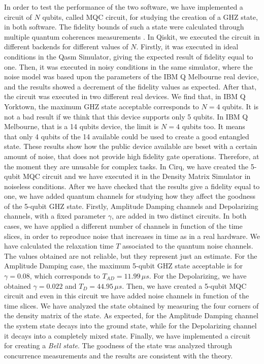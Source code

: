 \documentclass[11pt, a4paper, twoside, openright]{book}
\renewcommand{\'}[0]{\`}
\theoremstyle{definition}
\begin{document}
In order to test  the performance of the two software, we have implemented a circuit of $N$ qubits, called MQC circuit, for studying the creation of a GHZ state, in both software.
 The fidelity bounds of such a state were calculated through multiple quantum coherences measurements \cite{Article}.
  In Qiskit, we executed the circuit in different backends for different values of $N$. Firstly, it was executed in ideal conditions in the Qasm Simulator, giving the expected result of fidelity equal to one. Then, it was executed in noisy conditions in the same simulator, where the noise model was based upon the parameters of the IBM Q Melbourne real device, and the results showed a decrement of the fidelity values as expected. 
After that, the circuit was executed in two different real devices. We find that, in IBM Q Yorktown, the maximum GHZ state acceptable \cite{Fidelity} corresponds to $N=4$ qubits. It is not a bad result if we think that this device supports only 5 qubits. In IBM Q Melbourne, that is a 14 qubits device, the limit is $N=4$ qubits too. It means that only 4 qubits of the 14 available could be used to create a good entangled state.
These results show  how the public device available are beset with a certain amount of noise, that does not provide high fidelity gate operations. Therefore, at the moment they are unusable for complex tasks.
In Cirq, we have created the 5-qubit MQC circuit and we have executed it in the Density Matrix Simulator in noiseless conditions. After we have checked that the results give a fidelity equal to one, we have added quantum channels for studying how they affect the goodness of the 5-qubit GHZ state. 
Firstly, Amplitude Damping channels and Depolarizing channels, with a fixed parameter $\gamma$, are added in two distinct circuits. In both cases, we have applied a different number of channels in function of the time slices, in order to reproduce noise that increases in time as in a real hardware. We have calculated the relaxation time $T$ associated to the quantum noise channels. The values obtained are not reliable, but they represent just an estimate.
For the Amplitude Damping case, the maximum 5-qubit GHZ state acceptable is for $\gamma=0.08$, which corresponds to $T_{AD}=11.99\, \mu s$. For the Depolarizing, we have obtained $\gamma=0.022$ and $T_{D}=44.95\, \mu s$. Then, we have created a 5-qubit MQC circuit and even in this circuit we have added noise channels in function of the time slices. We have analyzed the state obtained by measuring the four corners of the density matrix of the state. As expected, for the Amplitude Damping channel the system state decays into the ground state, while for the Depolarizing channel it decays into a completely mixed state.
Finally, we have implemented a circuit for creating a \textit{Bell state}. The goodness of the state was analyzed through concurrence measurements and the results are consistent with the theory.
\end{document}
